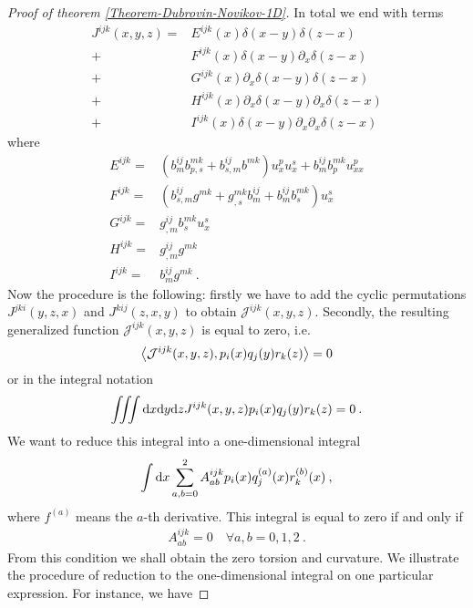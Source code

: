 \begin{proof}[Proof of theorem \ref{Theorem-Dubrovin-Novikov-1D}]
    In total we end with terms
    \begin{align}
        J^{ijk}(x,y,z) =& 
        E^{ijk}(x) \delta(x-y) \delta(z-x) 
        \\+& F^{ijk}(x) \delta(x-y) \partial_x \delta(z-x) 
        \\+& G^{ijk}(x) \partial_x \delta(x-y) \delta (z-x) 
        \\+& H^{ijk}(x) \partial_x \delta(x-y) \partial_x \delta (z-x) 
        \\+& I^{ijk}(x) \delta(x-y) \partial_x \partial_x \delta (z-x)
    \end{align}
    where
    \begin{align}
        E^{ijk} =& (b^{ij}_m b^{mk}_{p,s} + b^{ij}_{s,m} b^{mk} ) u^p_x u^s_x + b^{ij}_m b^{mk}_p u^p_{xx} \\
        F^{ijk} =& (b^{ij}_{s,m} g^{mk} + g^{mk}_{,s} b^{ij}_m + b^{ij}_m b^{mk}_s)u_x^s \\
        G^{ijk} =& g^{ij}_{,m} b^{mk}_s u^s_x \\
        H^{ijk} =& g^{ij}_{,m} g^{mk} \\
        I^{ijk} =& b^{ij}_m g^{mk} \:.
    \end{align}
    Now the procedure is the following: firstly we have to add the cyclic permutations $J^{jki}(y,z,x)$ and $J^{kij}(z,x,y)$ to obtain $\mathcal J^{ijk}(x,y,z)$. Secondly, the resulting generalized function $\mathcal J^{ijk}(x,y,z)$ is equal to zero, i.e.
    \begin{align}
        \left \langle \mathcal J^{ijk}(x,y,z) ,p_i(x)q_j(y)r_k(z) \right \rangle = 0
    \end{align}
    or in the integral notation 
    \begin{align}
        \iiint \mathrm{d} x \mathrm{d} y \mathrm{d} z J^{ijk}(x,y,z) p_i(x)q_j(y)r_k(z) = 0 \:.
    \end{align}
    We want to reduce this integral into a one-dimensional integral
    \begin{align}
        \int \mathrm{d} x \sum_{a,b = 0}^2 A^{ijk}_{ab} p_i(x) q^{(a)}_j(x) r^{(b)}_k (x) \:,
    \end{align}
    where $f^{(a)}$ means the $a$-th derivative. This integral is equal to zero if and only if
    \begin{align}
        A^{ijk}_{ab} = 0 \quad \forall a,b = 0,1,2 \:.
    \end{align}
    From this condition we shall obtain the zero torsion and curvature.
    We illustrate the procedure of reduction to the one-dimensional integral on one particular expression. For instance, we have

\end{proof}
